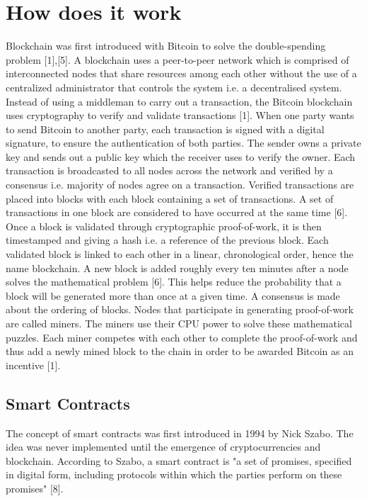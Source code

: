 \documentclass[report]{IEEEtran}
\begin{document}
\section{How does it work}
 Blockchain was first introduced with Bitcoin to solve the double-spending problem [1],[5]. A blockchain uses a peer-to-peer network which is comprised of interconnected nodes that share resources among each other without the use of a centralized administrator that controls the system i.e. a decentralised system. Instead of using a middleman to carry out a transaction, the Bitcoin blockchain uses cryptography to verify and validate transactions [1]. When one party wants to send Bitcoin to another party, each transaction is signed with a digital signature, to ensure the authentication of both parties. The sender owns a private key and sends out a public key which the receiver uses to verify the owner. Each transaction is broadcasted to all nodes across the network and verified by a consensus i.e. majority of nodes agree on a transaction. Verified transactions are placed into blocks with each block containing a set of transactions. A set of transactions in one block are considered to have occurred at the same time [6]. Once a block is validated through cryptographic proof-of-work, it is then timestamped and giving a hash i.e. a reference of the previous block. Each validated block is linked to each other in a linear, chronological order, hence the name blockchain. A new block is added roughly every ten minutes after a node solves the mathematical problem [6]. This helps reduce the probability that a block will be generated more than once at a given time. A consensus is made about the ordering of blocks. Nodes that participate in generating proof-of-work are called miners. The miners use their CPU power to solve these mathematical puzzles. Each miner competes with each other to complete the proof-of-work and thus add a newly mined block to the chain in order to be awarded Bitcoin as an incentive [1].  
 
 \subsection{Smart Contracts}
 The concept of smart contracts was first introduced in 1994 by Nick Szabo. The idea was never implemented until the emergence of cryptocurrencies and blockchain. According to Szabo, a smart contract is "a set of promises, specified in digital form, including protocols within which the parties perform on these promises" [8]. 
\end{document}
